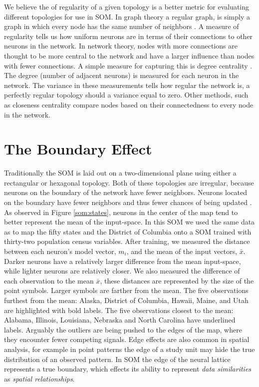 We believe the of regularity of a given topology is a better metric
for evaluating different topologies for use in SOM. In graph theory a regular
graph, is simply a graph in which every node has the same number of neighbors
\citep{harris2000}. A measure of regularity tells us how uniform neurons
are in terms of their connections to other neurons in the network. In network
theory, nodes with more connections are thought to be more central to the network and have a
larger influence than nodes with fewer connections. A simple measure for
capturing this is degree centrality \citep{Wasserman:1994}.  The degree (number
of adjacent neurons) is measured for each neuron in the network. The variance
in these measurements tells how regular the network is, a perfectly regular
topology should a variance equal to zero.  Other methods, such as closeness
centrality compare nodes based on their connectedness to every node in the
network.

\section{The Boundary Effect}
\label{bg:edge}
Traditionally the SOM is laid out on a two-dimensional plane using either a
rectangular or hexagonal topology.  Both of these topologies are irregular,
because neurons on the boundary of the network have fewer neighbors.  Neurons
located on the boundary have fewer neighbors and thus fewer chances of being
updated \citep{wu2006}.  As observed in Figure \ref{som:states}, neurons in
the center of the map tend to better represent the mean of the input-space.
In this SOM we used the same data as \cite{skupin08} to map the fifty states
and the District of Columbia onto a SOM trained with thirty-two population
census variables. After training, we measured the distance between each
neuron's model vector, $m_i$, and the mean of the input vectors, $\bar{x}$.
Darker neurons have a relatively larger difference from the mean input-space,
while lighter neurons are relatively closer. We also measured the difference
of each observation to the mean $\bar{x}$, these distances are represented by
the size of the point symbols.  Larger symbols are farther from the mean. The
five observations furthest from the mean: Alaska, District of Columbia,
Hawaii, Maine, and Utah are highlighted with bold labels.  The five
observations closest to the mean: Alabama, Illinois, Louisiana, Nebraska and
North Carolina have underlined labels.  Arguably the outliers are being pushed
to the edges of the map, where they encounter fewer competing signals.
Edge effects are also common in spatial analysis, for example in point
patterns the edge of a study unit may hide the true distribution of an
observed pattern.  In SOM the edge of the neural lattice represents a true
boundary, which effects its ability to represent \emph{data similarities} as
\emph{spatial relationships}.

